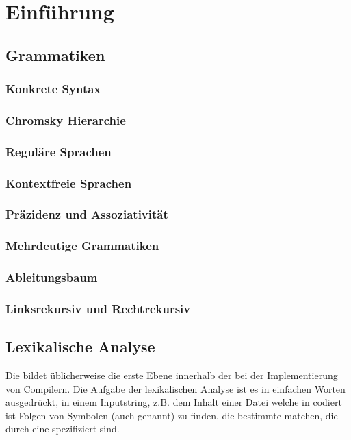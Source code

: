 \chapter{Einführung}
\section{Grammatiken}
\subsection{Konkrete Syntax}
\subsection{Chromsky Hierarchie}
\subsection{Reguläre Sprachen}
\subsection{Kontextfreie Sprachen}
\subsection{Präzidenz und Assoziativität}
\subsection{Mehrdeutige Grammatiken}
\subsection{Ableitungsbaum}
\subsection{Linksrekursiv und Rechtrekursiv}
\section{Lexikalische Analyse}
Die  bildet üblicherweise die erste Ebene innerhalb der  bei der Implementierung von Compilern. Die Aufgabe der lexikalischen Analyse ist es in einfachen Worten ausgedrückt, in einem Inputstring, z.B. dem Inhalt einer Datei welche in  codiert ist Folgen von Symbolen (auch  genannt) zu finden, die bestimmte  matchen, die durch eine  spezifiziert sind.

